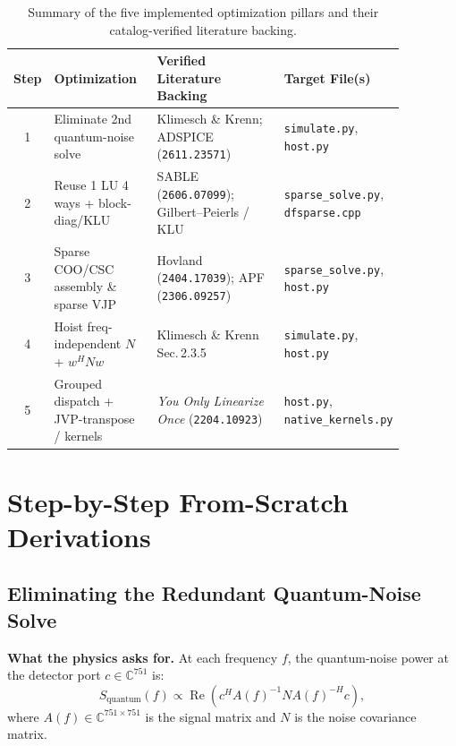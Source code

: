 \documentclass[11pt,a4paper]{article}
\begin{document}
\begin{table}[ht]
\centering
\footnotesize
\setlength{\tabcolsep}{4pt}
\begin{tabular}{@{}cp{0.27\linewidth}p{0.36\linewidth}p{0.24\linewidth}@{}}
\toprule
\textbf{Step} & \textbf{Optimization} & \textbf{Verified Literature Backing} & \textbf{Target File(s)} \\
\midrule
1 & Eliminate 2nd quantum-noise solve & Klimesch \& Krenn; ADSPICE (\texttt{2611.23571}) & \texttt{simulate.py}, \texttt{host.py} \\
2 & Reuse 1 LU 4 ways + block-diag/KLU & SABLE (\texttt{2606.07099}); Gilbert--Peierls / KLU & \texttt{sparse\_solve.py}, \texttt{dfsparse.cpp} \\
3 & Sparse COO/CSC assembly \& sparse VJP & Hovland (\texttt{2404.17039}); APF (\texttt{2306.09257}) & \texttt{sparse\_solve.py}, \texttt{host.py} \\
4 & Hoist freq-independent $N$ + $w^H N w$ & Klimesch \& Krenn Sec.\,2.3.5 & \texttt{simulate.py}, \texttt{host.py} \\
5 & Grouped dispatch + JVP-transpose / kernels & \emph{You Only Linearize Once} (\texttt{2204.10923}) & \texttt{host.py}, \texttt{native\_kernels.py} \\
\bottomrule
\end{tabular}
\caption{Summary of the five implemented optimization pillars and their catalog-verified literature backing.}
\label{tab:verdicts}
\end{table}

\section{Step-by-Step From-Scratch Derivations}

\subsection{Eliminating the Redundant Quantum-Noise Solve}

\textbf{What the physics asks for.} At each frequency $f$, the quantum-noise power at the detector port $c \in \mathbb{C}^{751}$ is:
\begin{equation}
S_{\text{quantum}}(f) \propto \operatorname{Re}\!\left(c^H A(f)^{-1} N A(f)^{-H} c\right),
\end{equation}
where $A(f) \in \mathbb{C}^{751\times 751}$ is the signal matrix and $N$ is the noise covariance matrix.
\end{document}
